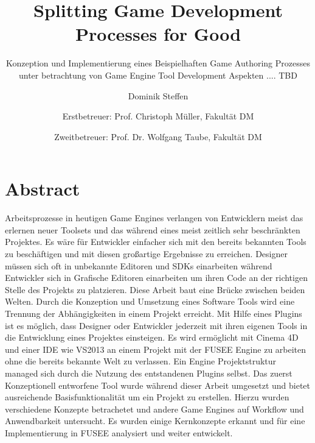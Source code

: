 \documentclass[pagesize, paper=a4, fontsize=12pt,titlepage=true, headings=small, headnosepline, abstractoff, liststotoc, nochapterprefix, plainheadsepline, twoside]{scrreprt}
\author{
Dominik Steffen \and
Erstbetreuer: Prof. Christoph Müller, Fakultät DM \and
Zweitbetreuer: Prof. Dr. Wolfgang Taube, Fakultät DM
}
\title{Splitting Game Development Processes for Good}
\subtitle{Konzeption und Implementierung eines Beispielhaften Game Authoring Prozesses unter betrachtung von Game Engine Tool Development Aspekten .... TBD}
\begin{document}



\newpage
\thispagestyle{empty}
\mbox{}

\begingroup
\newpage
\pagestyle{empty}
\renewcommand*{\chapterpagestyle}{empty}
\chapter*{Abstract}%
Arbeitsprozesse in heutigen Game Engines verlangen von Entwicklern meist das erlernen neuer Toolsets und das während eines meist zeitlich sehr beschränkten Projektes. Es wäre für Entwickler einfacher sich mit den bereits bekannten Tools zu beschäftigen und mit diesen großartige Ergebnisse zu erreichen. Designer müssen sich oft in unbekannte Editoren und SDKs einarbeiten während Entwickler sich in Grafische Editoren einarbeiten um ihren Code an der richtigen Stelle des Projekts zu platzieren.
Diese Arbeit baut eine Brücke zwischen beiden Welten. Durch die Konzeption und Umsetzung eines Software Tools wird eine Trennung der Abhängigkeiten in einem Projekt erreicht. Mit Hilfe eines Plugins ist es möglich, dass Designer oder Entwickler jederzeit mit ihren eigenen Tools in die Entwicklung eines Projektes einsteigen. Es wird ermöglicht mit Cinema 4D und einer IDE wie VS2013 an einem Projekt mit der FUSEE Engine zu arbeiten ohne die bereits bekannte Welt zu verlassen. Ein Engine Projektstruktur managed sich durch die Nutzung des entstandenen Plugins selbst.
Das zuerst Konzeptionell entworfene Tool wurde während dieser Arbeit umgesetzt und bietet ausreichende Basisfunktionalität um ein Projekt zu erstellen. Hierzu wurden verschiedene Konzepte betrachetet und andere Game Engines auf Workflow und Anwendbarkeit untersucht. Es wurden einige Kernkonzepte erkannt und für eine Implementierung in FUSEE analysiert und weiter entwickelt.
\clearpage
\endgroup

\newpage
\thispagestyle{empty}
\mbox{}
\end{document}
